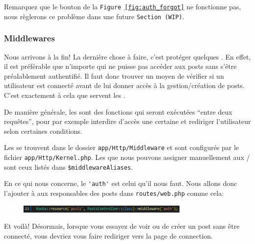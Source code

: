\newpage

Remarquez que le bouton de la \texttt{Figure~\ref{fig:auth_forgot}} ne fonctionne pas, nous règlerons ce problème dans une future \texttt{Section~(WIP)}.

\subsubsection[Middlewares][laravel.com/docs/10.x/middleware]{Middlewares}

Nous arrivons à la fin! La dernière chose à faire, c'est protéger quelques \routes. En effet, il est préférable que n'importe qui ne puisse pas accéder aux posts sans s'être préalablement authentifié. Il faut donc trouver un moyen de vérifier si un utilisateur est connecté avant de lui donner accès à la gestion/création de posts. C'est exactement à cela que servent les \middlewares{}.

De manière générale, les \middlewares{} sont des fonctions qui seront exécutées ``entre deux requêtes'', pour par exemple interdire d'accès une certaine \route{} et rediriger l'utilisateur selon certaines conditions.

Les \middlewares{} se trouvent dans le dossier \verb|app/Http/Middleware| et sont configurés par le fichier \verb|app/Http/Kernel.php|. Les \middlewares{} que nous pouvons assigner manuellement aux \routes{}/\controllers{} sont ceux listés dans \verb|$middlewareAliases|.

En ce qui nous concerne, le \middleware{} \verb|'auth'| est celui qu'il nous faut. Nous allons donc l'ajouter à aux \routes{} responsables des posts dans \verb|routes/web.php| comme cela:

\begin{figure}[!h]
    \centering
    \includegraphics[width=0.75\textwidth]{figures-C1/middleware_auth.pdf}
\end{figure}

Et voilà! Désormais, lorsque vous essayez de voir ou de créer un post sans être connecté, vous devriez vous faire rediriger vers la page de connection.

\newpage
